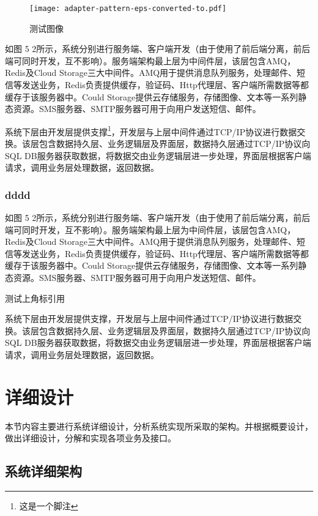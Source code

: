 \documentclass[oneside]{jufethesis}
\begin{document}
\begin{figure}[htbp]
  \figspace
  \centering
  \texttt{[image: adapter-pattern-eps-converted-to.pdf]}
  \caption{测试图像}
  \label{fig_test}
\end{figure}
如图 5 2所示，系统分别进行服务端、客户端开发（由于使用了前后端分离，前后端可同时开发，互不影响）。服务端架构最上层为中间件层，该层包含AMQ，Redis及Cloud Storage三大中间件。AMQ用于提供消息队列服务，处理邮件、短信等发送业务，Redis负责提供缓存，验证码、Http代理层、客户端所需数据等都缓存于该服务器中。Could Storage提供云存储服务，存储图像、文本等一系列静态资源。SMS服务器、SMTP服务器可用于向用户发送短信、邮件。

系统下层由开发层提供支撑\footnote[1]{这是一个脚注}，开发层与上层中间件通过TCP/IP协议进行数据交换。该层包含数据持久层、业务逻辑层及界面层，数据持久层通过TCP/IP协议向SQL DB服务器获取数据，将数据交由业务逻辑层进一步处理，界面层根据客户端请求，调用业务层处理数据，返回数据。

\subsubsection{dddd}
如图 5 2所示，系统分别进行服务端、客户端开发（由于使用了前后端分离，前后端可同时开发，互不影响）。服务端架构最上层为中间件层，该层包含AMQ，Redis及Cloud Storage三大中间件。AMQ用于提供消息队列服务，处理邮件、短信等发送业务，Redis负责提供缓存，验证码、Http代理层、客户端所需数据等都缓存于该服务器中。Could Storage提供云存储服务，存储图像、文本等一系列静态资源。SMS服务器、SMTP服务器可用于向用户发送短信、邮件。

\cite{weaver2012pro}

测试上角标引用

系统下层由开发层提供支撑，开发层与上层中间件通过TCP/IP协议进行数据交换。该层包含数据持久层、业务逻辑层及界面层，数据持久层通过TCP/IP协议向SQL DB服务器获取数据，将数据交由业务逻辑层进一步处理，界面层根据客户端请求，调用业务层处理数据，返回数据。

\section{详细设计}\label{sec_detail_design}
本节内容主要进行系统详细设计，分析系统实现所采取的架构。并根据概要设计，做出详细设计，分解和实现各项业务及接口。

\subsection{系统详细架构}
\end{document}
